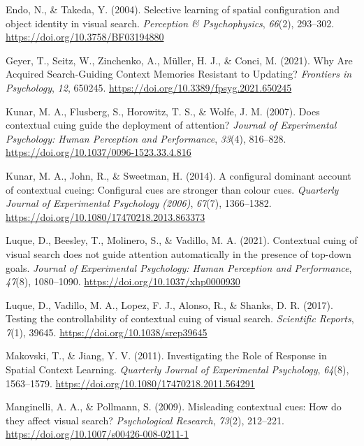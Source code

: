\documentclass[
  man,
  floatsintext,
  longtable,
  nolmodern,
  notxfonts,
  notimes,
  colorlinks=true,linkcolor=blue,citecolor=blue,urlcolor=blue]{apa7}
\newlength{\cslhangindent}
\newenvironment{CSLReferences}[2] %
 {\begin{list}{}{%
  \setlength{\itemindent}{0pt}
  \setlength{\leftmargin}{0pt}
  \setlength{\parsep}{0pt}
  \ifodd #1
   \setlength{\leftmargin}{\cslhangindent}
   \setlength{\itemindent}{-1\cslhangindent}
  \fi
  \setlength{\itemsep}{#2\baselineskip}}}
 {\end{list}}
\begin{document}
\begin{CSLReferences}{1}{0}
Endo, N., \& Takeda, Y. (2004). Selective learning of spatial
configuration and object identity in visual search. \emph{Perception \&
Psychophysics}, \emph{66}(2), 293--302.
\url{https://doi.org/10.3758/BF03194880}

Geyer, T., Seitz, W., Zinchenko, A., Müller, H. J., \& Conci, M. (2021).
Why {Are Acquired Search-Guiding Context Memories Resistant} to
{Updating}? \emph{Frontiers in Psychology}, \emph{12}, 650245.
\url{https://doi.org/10.3389/fpsyg.2021.650245}

Kunar, M. A., Flusberg, S., Horowitz, T. S., \& Wolfe, J. M. (2007).
Does contextual cuing guide the deployment of attention? \emph{Journal
of Experimental Psychology: Human Perception and Performance},
\emph{33}(4), 816--828. \url{https://doi.org/10.1037/0096-1523.33.4.816}

Kunar, M. A., John, R., \& Sweetman, H. (2014). A configural dominant
account of contextual cueing: {Configural} cues are stronger than colour
cues. \emph{Quarterly Journal of Experimental Psychology (2006)},
\emph{67}(7), 1366--1382.
\url{https://doi.org/10.1080/17470218.2013.863373}

Luque, D., Beesley, T., Molinero, S., \& Vadillo, M. A. (2021).
Contextual cuing of visual search does not guide attention automatically
in the presence of top-down goals. \emph{Journal of Experimental
Psychology: Human Perception and Performance}, \emph{47}(8), 1080--1090.
\url{https://doi.org/10.1037/xhp0000930}

Luque, D., Vadillo, M. A., Lopez, F. J., Alonso, R., \& Shanks, D. R.
(2017). Testing the controllability of contextual cuing of visual
search. \emph{Scientific Reports}, \emph{7}(1), 39645.
\url{https://doi.org/10.1038/srep39645}

Makovski, T., \& Jiang, Y. V. (2011). Investigating the {Role} of
{Response} in {Spatial Context Learning}. \emph{Quarterly Journal of
Experimental Psychology}, \emph{64}(8), 1563--1579.
\url{https://doi.org/10.1080/17470218.2011.564291}

Manginelli, A. A., \& Pollmann, S. (2009). Misleading contextual cues:
{How} do they affect visual search? \emph{Psychological Research},
\emph{73}(2), 212--221. \url{https://doi.org/10.1007/s00426-008-0211-1}


\end{CSLReferences}
\end{document}

